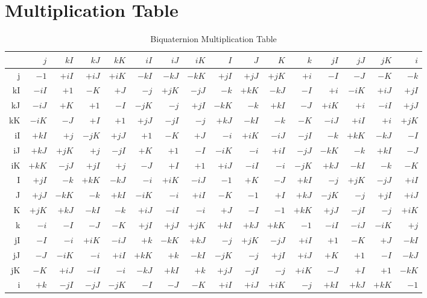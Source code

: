 \documentclass[dvipdfmx,a4paper]{article}
\begin{document}
\clearpage
\appendix
\section{Multiplication Table}
\label{app:mult-table}

\begin{table}[ht]
  \begin{center}
    \caption{Biquaternion Multiplication Table}
    \small
    \begin{tabular}{r|rrrrrrrrrrrrrrr}
      &$j$&$kI$&$kJ$&$kK$&$iI$&$iJ$&$iK$&$I$&$J$&$K$&$k$&$jI$&$jJ$&$jK$&$i$ \\ \hline
      j&$-1$&$+iI$&$+iJ$&$+iK$&$-kI$&$-kJ$&$-kK$&$+jI$&$+jJ$&$+jK$&$+i$&$-I$&$-J$&$-K$&$-k$ \\ \hline
      kI&$-iI$&$+1$&$-K$&$+J$&$-j$&$+jK$&$-jJ$&$-k$&$+kK$&$-kJ$&$-I$&$+i$&$-iK$&$+iJ$&$+jI$ \\ \hline
      kJ&$-iJ$&$+K$&$+1$&$-I$&$-jK$&$-j$&$+jI$&$-kK$&$-k$&$+kI$&$-J$&$+iK$&$+i$&$-iI$&$+jJ$ \\ \hline
      kK&$-iK$&$-J$&$+I$&$+1$&$+jJ$&$-jI$&$-j$&$+kJ$&$-kI$&$-k$&$-K$&$-iJ$&$+iI$&$+i$&$+jK$ \\ \hline
      iI&$+kI$&$+j$&$-jK$&$+jJ$&$+1$&$-K$&$+J$&$-i$&$+iK$&$-iJ$&$-jI$&$-k$&$+kK$&$-kJ$&$-I$ \\ \hline
      iJ&$+kJ$&$+jK$&$+j$&$-jI$&$+K$&$+1$&$-I$&$-iK$&$-i$&$+iI$&$-jJ$&$-kK$&$-k$&$+kI$&$-J$ \\ \hline
      iK&$+kK$&$-jJ$&$+jI$&$+j$&$-J$&$+I$&$+1$&$+iJ$&$-iI$&$-i$&$-jK$&$+kJ$&$-kI$&$-k$&$-K$ \\ \hline
      I&$+jI$&$-k$&$+kK$&$-kJ$&$-i$&$+iK$&$-iJ$&$-1$&$+K$&$-J$&$+kI$&$-j$&$+jK$&$-jJ$&$+iI$ \\ \hline
      J&$+jJ$&$-kK$&$-k$&$+kI$&$-iK$&$-i$&$+iI$&$-K$&$-1$&$+I$&$+kJ$&$-jK$&$-j$&$+jI$&$+iJ$ \\ \hline
      K&$+jK$&$+kJ$&$-kI$&$-k$&$+iJ$&$-iI$&$-i$&$+J$&$-I$&$-1$&$+kK$&$+jJ$&$-jI$&$-j$&$+iK$ \\ \hline
      k&$-i$&$-I$&$-J$&$-K$&$+jI$&$+jJ$&$+jK$&$+kI$&$+kJ$&$+kK$&$-1$&$-iI$&$-iJ$&$-iK$&$+j$ \\ \hline
      jI&$-I$&$-i$&$+iK$&$-iJ$&$+k$&$-kK$&$+kJ$&$-j$&$+jK$&$-jJ$&$+iI$&$+1$&$-K$&$+J$&$-kI$ \\ \hline
      jJ&$-J$&$-iK$&$-i$&$+iI$&$+kK$&$+k$&$-kI$&$-jK$&$-j$&$+jI$&$+iJ$&$+K$&$+1$&$-I$&$-kJ$ \\ \hline
      jK&$-K$&$+iJ$&$-iI$&$-i$&$-kJ$&$+kI$&$+k$&$+jJ$&$-jI$&$-j$&$+iK$&$-J$&$+I$&$+1$&$-kK$ \\ \hline
      i&$+k$&$-jI$&$-jJ$&$-jK$&$-I$&$-J$&$-K$&$+iI$&$+iJ$&$+iK$&$-j$&$+kI$&$+kJ$&$+kK$&$-1$ \\ \hline
    \end{tabular}
  \end{center}
\end{table}
\end{document}
